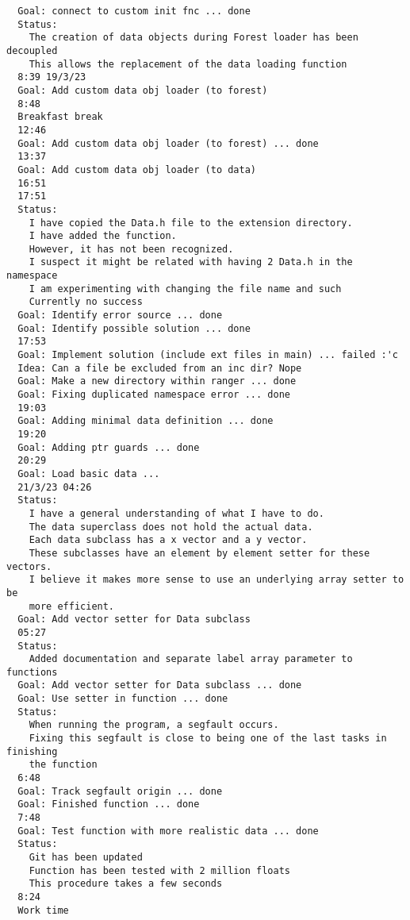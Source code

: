 \documentclass[12pt,oneside]{book}
\begin{document}
\begin{lstlisting}
  Goal: connect to custom init fnc ... done
  Status:
    The creation of data objects during Forest loader has been decoupled
    This allows the replacement of the data loading function
  8:39 19/3/23
  Goal: Add custom data obj loader (to forest)
  8:48
  Breakfast break
  12:46
  Goal: Add custom data obj loader (to forest) ... done
  13:37
  Goal: Add custom data obj loader (to data)
  16:51
  17:51
  Status:
    I have copied the Data.h file to the extension directory.
    I have added the function.
    However, it has not been recognized.
    I suspect it might be related with having 2 Data.h in the namespace
    I am experimenting with changing the file name and such
    Currently no success
  Goal: Identify error source ... done
  Goal: Identify possible solution ... done
  17:53
  Goal: Implement solution (include ext files in main) ... failed :'c
  Idea: Can a file be excluded from an inc dir? Nope
  Goal: Make a new directory within ranger ... done
  Goal: Fixing duplicated namespace error ... done
  19:03
  Goal: Adding minimal data definition ... done
  19:20
  Goal: Adding ptr guards ... done
  20:29
  Goal: Load basic data ... 
  21/3/23 04:26
  Status:
    I have a general understanding of what I have to do.
    The data superclass does not hold the actual data.
    Each data subclass has a x vector and a y vector.
    These subclasses have an element by element setter for these vectors.
    I believe it makes more sense to use an underlying array setter to be
    more efficient.
  Goal: Add vector setter for Data subclass
  05:27
  Status:
    Added documentation and separate label array parameter to functions
  Goal: Add vector setter for Data subclass ... done
  Goal: Use setter in function ... done
  Status:
    When running the program, a segfault occurs.
    Fixing this segfault is close to being one of the last tasks in finishing
    the function
  6:48
  Goal: Track segfault origin ... done
  Goal: Finished function ... done
  7:48
  Goal: Test function with more realistic data ... done
  Status:
    Git has been updated
    Function has been tested with 2 million floats
    This procedure takes a few seconds
  8:24
  Work time
\end{lstlisting}

  \printbibliography[title={Bibliografía},heading=bibintoc]
\end{document}
